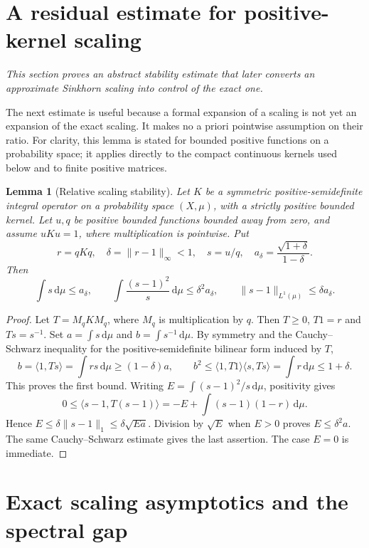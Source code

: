 \documentclass[11pt,a4paper]{article}
\newtheorem{lemma}[theorem]{Lemma}
\theoremstyle{definition}\newtheorem{definition}[theorem]{Definition}
\theoremstyle{remark}\newtheorem{remark}[theorem]{Remark}
\newcommand{\dd}{\,\mathrm d}
\newcommand{\norm}[1]{\lVert #1\rVert}
\begin{document}
\section{A residual estimate for positive-kernel scaling}\label{sec:stability}

\noindent\emph{This section proves an abstract stability estimate that later converts an approximate Sinkhorn scaling into control of the exact one.}

The next estimate is useful because a formal expansion of a scaling is not yet an expansion of the exact scaling. It makes no a priori pointwise assumption on their ratio. For clarity, this lemma is stated for bounded positive functions on a probability space; it applies directly to the compact continuous kernels used below and to finite positive matrices.

\begin{lemma}[Relative scaling stability]\label{lem:stability}
Let $K$ be a symmetric positive-semidefinite integral operator on a probability space $(X,\mu)$, with a strictly positive bounded kernel. Let $u,q$ be positive bounded functions bounded away from zero, and assume $uKu=1$, where multiplication is pointwise. Put
\[
r=qKq,\quad \delta=\norm{r-1}_\infty<1,\quad s=u/q,\quad
a_\delta=\frac{\sqrt{1+\delta}}{1-\delta}.
\]
Then
\begin{equation}\label{eq:stable}
\int s\dd\mu\leq a_\delta,\qquad
\int\frac{(s-1)^2}{s}\dd\mu\leq\delta^2a_\delta,\qquad
\norm{s-1}_{L^1(\mu)}\leq\delta a_\delta.
\end{equation}
\end{lemma}
\begin{proof}
Let $T=M_qKM_q$, where $M_q$ is multiplication by $q$. Then $T\geq0$, $T1=r$ and $Ts=s^{-1}$. Set $a=\int s\dd\mu$ and $b=\int s^{-1}\dd\mu$. By symmetry and the Cauchy--Schwarz inequality for the positive-semidefinite bilinear form induced by $T$,
\[
b=\langle1,Ts\rangle=\int rs\dd\mu\geq(1-\delta)a,
\qquad b^2\leq\langle1,T1\rangle\langle s,Ts\rangle=\int r\dd\mu\leq1+\delta.
\]
This proves the first bound. Writing $E=\int(s-1)^2/s\dd\mu$, positivity gives
\[
0\leq\langle s-1,T(s-1)\rangle
=-E+\int(s-1)(1-r)\dd\mu.
\]
Hence $E\leq\delta\norm{s-1}_1\leq\delta\sqrt{Ea}$. Division by $\sqrt E$ when $E>0$ proves $E\leq\delta^2a$. The same Cauchy--Schwarz estimate gives the last assertion. The case $E=0$ is immediate.
\end{proof}

\section{Exact scaling asymptotics and the spectral gap}\label{sec:scaling}
\end{document}
